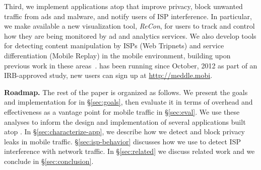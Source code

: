 Third, we implement applications atop \meddle that improve 
privacy, block unwanted traffic from ads and malware, and notify users of ISP interference. 
In particular, we make available a new visualization tool, \emph{ReCon}, for users to track and control how 
they are being monitored by ad and analytics services. 
 We also develop tools for detecting content manipulation by ISPs (Web Tripnets) and 
 service differentiation (Mobile Replay) in the mobile environment, building upon previous 
 work in these areas~\cite{reis:tripwires,dischinger:glasnost}. \meddle has been running since 
October, 2012 as part of an IRB-approved study, new users can sign up at \url{http://meddle.mobi}. 






\noindent\textbf{Roadmap.} The rest of the paper is organized as follows. We present the goals and implementation for \meddle in \S\ref{sec:goals}, then evaluate it in terms of overhead and effectiveness as a vantage point for mobile traffic in \S\ref{sec:eval}. We use these analyses to inform the design and implementation of several applications built atop \meddle. 
In \S\ref{sec:characterize-app}, we describe how we detect and block privacy leaks in mobile traffic. \S\ref{sec:isp-behavior} discusses 
how we use \meddle to detect ISP interference with network traffic. In \S\ref{sec:related} we discuss related work and we conclude in \S\ref{sec:conclusion}.


